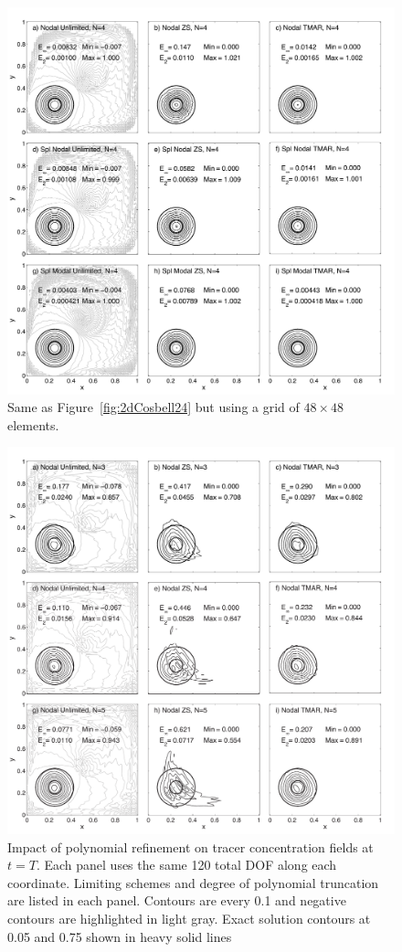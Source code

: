 \documentclass{ametsoc}
\begin{document}
\begin{figure}[t]
\includegraphics[width=\textwidth]{figs/2d/_defCosbell_9pan_48e.pdf}
\caption{Same as Figure~\ref{fig:2dCosbell24} but using a grid of $48\times48$ elements.}\label{fig:2dCosbell48}
\end{figure}

\begin{figure}[t]
\includegraphics[width=\textwidth]{figs/2d/_defCosbell_9pan_pref.pdf}
\caption{Impact of polynomial refinement on tracer concentration fields at $t=T$. Each panel uses the same 120 total DOF along each coordinate. Limiting schemes and degree of polynomial truncation are listed in each panel. Contours are every 0.1 and negative contours are highlighted in light gray. Exact solution contours at 0.05 and 0.75 shown in heavy solid lines}\label{fig:2dCosbellPref}
\end{figure}
\end{document}
